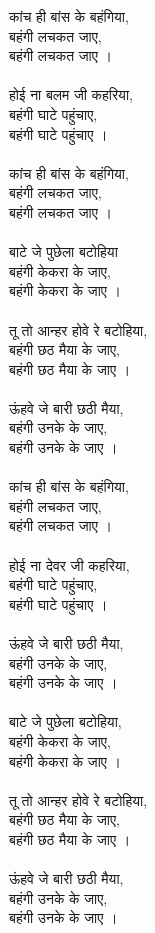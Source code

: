 \documentclass[17pt]{extarticle}
\begin{document}
\begin{hindi}

कांच ही बांस के बहंगिया,\\
बहंगी लचकत जाए,\\
बहंगी लचकत जाए ।\\\\
होई ना बलम जी कहरिया,\\
बहंगी घाटे पहुंचाए,\\
बहंगी घाटे पहुंचाए ।\\\\
कांच ही बांस के बहंगिया,\\
बहंगी लचकत जाए,\\
बहंगी लचकत जाए ।\\\\
बाटे जे पुछेला बटोहिया\\
बहंगी केकरा के जाए,\\
बहंगी केकरा के जाए ।\\\\
तू तो आन्हर होवे रे बटोहिया,\\
बहंगी छठ मैया के जाए,\\
बहंगी छठ मैया के जाए ।\\\\
ऊंहवे जे बारी छठी मैया,\\
बहंगी उनके के जाए,\\
बहंगी उनके के जाए ।\\\\
कांच ही बांस के बहंगिया,\\
बहंगी लचकत जाए,\\
बहंगी लचकत जाए ।\\\\
होई ना देवर जी कहरिया,\\
बहंगी घाटे पहुंचाए,\\
बहंगी घाटे पहुंचाए ।\\\\
ऊंहवे जे बारी छठी मैया,\\
बहंगी उनके के जाए,\\
बहंगी उनके के जाए ।\\\\
बाटे जे पुछेला बटोहिया,\\
बहंगी केकरा के जाए,\\
बहंगी केकरा के जाए ।\\\\
तू तो आन्हर होवे रे बटोहिया,\\
बहंगी छठ मैया के जाए,\\
बहंगी छठ मैया के जाए ।\\\\
ऊंहवे जे बारी छठी मैया,\\
बहंगी उनके के जाए,\\
बहंगी उनके के जाए ।\\
\end{hindi}
\end{document}
